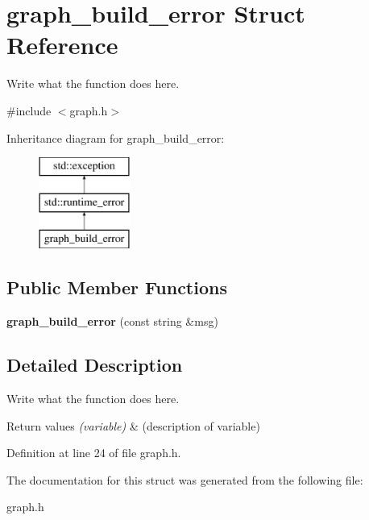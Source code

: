 \hypertarget{structgraph__build__error}{\section{graph\+\_\+build\+\_\+error Struct Reference}
\label{structgraph__build__error}
}


Write what the function does here.  




{\ttfamily \#include $<$graph.\+h$>$}

Inheritance diagram for graph\+\_\+build\+\_\+error\+:\begin{figure}[H]
\begin{center}
\leavevmode
\includegraphics[height=3.000000cm]{structgraph__build__error}
\end{center}
\end{figure}
\subsection*{Public Member Functions}
\begin{DoxyCompactItemize}
\item 
\hypertarget{structgraph__build__error_a5b6da9f94efcd703d99c2617381749c1}{{\bfseries graph\+\_\+build\+\_\+error} (const string \&msg)}\label{structgraph__build__error_a5b6da9f94efcd703d99c2617381749c1}

\end{DoxyCompactItemize}


\subsection{Detailed Description}
Write what the function does here. 


\begin{DoxyRetVals}{Return values}
{\em (variable)} & (description of variable) \\
\hline
\end{DoxyRetVals}


Definition at line 24 of file graph.\+h.



The documentation for this struct was generated from the following file\+:\begin{DoxyCompactItemize}
\item 
graph.\+h\end{DoxyCompactItemize}
